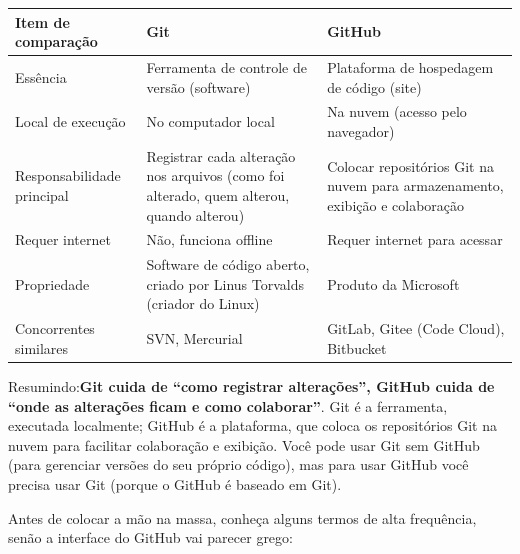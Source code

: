 \begin{center}
\begin{tabularx}{\linewidth}{|X|X|X|}
\hline
\textbf{Item de comparação} & \textbf{Git} & \textbf{GitHub} \tabularnewline
\hline
Essência & Ferramenta de controle de versão (software) & Plataforma de hospedagem de código (site) \tabularnewline
Local de execução & No computador local & Na nuvem (acesso pelo navegador) \tabularnewline
Responsabilidade principal & Registrar cada alteração nos arquivos (como foi alterado, quem alterou, quando alterou) & Colocar repositórios Git na nuvem para armazenamento, exibição e colaboração \tabularnewline
Requer internet & Não, funciona offline & Requer internet para acessar \tabularnewline
Propriedade & Software de código aberto, criado por Linus Torvalds (criador do Linux) & Produto da Microsoft \tabularnewline
Concorrentes similares & SVN, Mercurial & GitLab, Gitee (Code Cloud), Bitbucket \tabularnewline
\hline
\end{tabularx}
\end{center}

Resumindo:\textbf{Git cuida de “como registrar alterações”, GitHub cuida de “onde as alterações ficam e como colaborar”}. Git é a ferramenta, executada localmente; GitHub é a plataforma, que coloca os repositórios Git na nuvem para facilitar colaboração e exibição. Você pode usar Git sem GitHub (para gerenciar versões do seu próprio código), mas para usar GitHub você precisa usar Git (porque o GitHub é baseado em Git).



Antes de colocar a mão na massa, conheça alguns termos de alta frequência, senão a interface do GitHub vai parecer grego:

